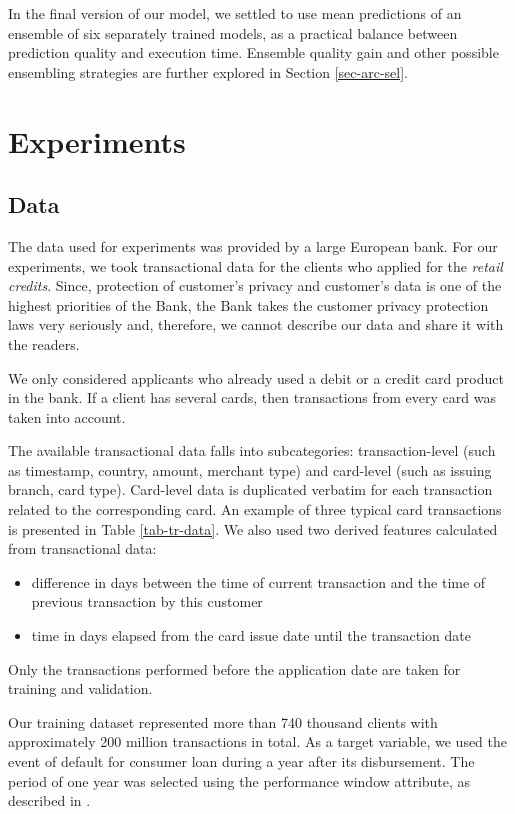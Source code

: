 \documentclass[sigconf]{acmart}
\begin{document}
In the final version of our model, we settled to use mean predictions of an ensemble of six separately trained models, as a practical balance between prediction quality and execution time. Ensemble quality gain and other possible ensembling strategies are further explored in Section \ref{sec-arc-sel}.

\section{Experiments} \label{sec-exp}
\subsection{Data} \label{sec-data}

The data used for experiments was provided by a large European bank. For our experiments, we took transactional data for the clients who applied for the \textit{retail credits}. Since, protection of customer's privacy and customer's data is one of the highest priorities of the Bank, the Bank takes the customer privacy protection laws very seriously and, therefore, we cannot describe our data and share it with the readers.

We only considered applicants who already used a debit or a credit card product in the bank. If a client has several cards, then transactions from every card was taken into account.

The available transactional data falls into subcategories: trans\-action-level (such as timestamp, country, amount, merchant type) and card-level (such as issuing branch, card type). Card-level data is duplicated verbatim for each transaction related to the corresponding card. An example of three typical card transactions is presented in Table \ref{tab-tr-data}.
We also used two derived features calculated from transactional data:
\begin{itemize}
\item difference in days between the time of current transaction and the time of previous transaction by this customer
\item time in days elapsed from the card issue date until the transaction date
\end{itemize}
Only the transactions performed before the application date are taken for training and validation.

Our training dataset represented more than 740 thousand clients with approximately 200 million transactions in total. As a target variable, we used the event of default for consumer loan during a year after its disbursement. The period of one year was selected using the performance window attribute, as described in \cite{siddiqi2005credit}.
\end{document}
